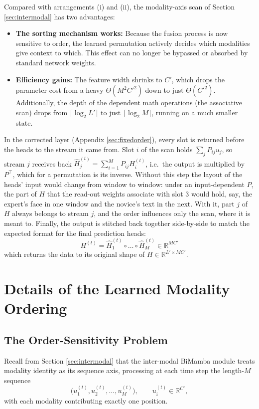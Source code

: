 \documentclass[10pt,a4paper,twocolumn]{article}
\newcommand{\R}{\mathbb{R}}
\begin{document}
	Compared with arrangements (i) and (ii), the modality-axis scan of Section \ref{sec:intermodal} has two advantages: \begin{itemize}
	    \item \textbf{The sorting mechanism works:} Because the fusion process is now sensitive to order, the learned permutation actively decides which modalities give context to which. This effect can no longer be bypassed or absorbed by standard network weights.
	    \item \textbf{Efficiency gains:} The feature width shrinks to $C'$, which drops the parameter cost from a heavy $\Theta(M^2C'^2)$ down to just $\Theta(C'^2)$. Additionally, the depth of the dependent math operations (the associative scan) drops from $\lceil\log_2 L'\rceil$ to just $\lceil\log_2 M\rceil$, running on a much smaller state.
	\end{itemize}

	In the corrected layer (Appendix \ref{sec:fixedorder}), every slot is returned before the heads to the stream it came from. Slot $i$ of the scan holds $\sum_j P_{ij} u_j$, so stream $j$ receives back $\hat{H}^{(t)}_j = \sum_{i=1}^{M} P_{ij} H^{(t)}_i$, i.e.\ the output is multiplied by $P^\top$, which for a permutation is its inverse. Without this step the layout of the heads' input would change from window to window: under an input-dependent $P$, the part of $H$ that the read-out weights associate with slot $3$ would hold, say, the expert's face in one window and the novice's text in the next. With it, part $j$ of $H$ always belongs to stream $j$, and the order influences only the scan, where it is meant to. Finally, the output is stitched back together side-by-side to match the expected format for the final prediction heads: $$H^{(t)} = \hat{H}_1^{(t)} \circ \dots \circ \hat{H}_M^{(t)} \in \R^{MC'}$$ which returns the data to its original shape of $H \in \R^{L' \times MC'}$.


	\section{Details of the Learned Modality Ordering}
	\label{app:ordering}
	\subsection*{The Order-Sensitivity Problem}
	Recall from Section \ref{sec:intermodal} that the inter-modal BiMamba module treats modality identity as its sequence axis, processing at each time step the length-$M$ sequence $$\bigl(u_1^{(t)}, u_2^{(t)}, \dots, u_M^{(t)}\bigr), \qquad u_i^{(t)} \in \R^{C'},$$ with each modality contributing exactly one position.
\end{document}
